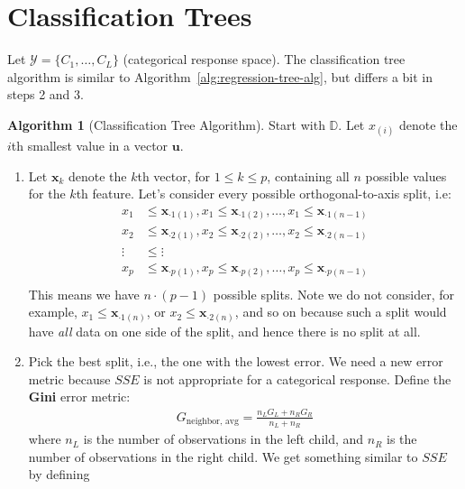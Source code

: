 \documentclass[12pt, a4paper]{article}
\theoremstyle{definition}
\newtheorem{algorithm}{Algorithm}
\begin{document}
	\section*{Classification Trees}
	Let $\mathcal{Y} = \{C_1, \ldots, C_L\}$ (categorical response space).
	The classification tree algorithm is similar to Algorithm~\ref{alg:regression-tree-alg},
	but differs a bit in steps 2 and 3.
	
	\begin{tcolorbox}[breakable]
		\begin{algorithm}[Classification Tree Algorithm]\label{alg:classification-tree-alg}
			Start with $\mathbb{D}$. Let $x_{(i)}$ denote the $i$th smallest
			value in a vector $\bm{u}$.
			\begin{enumerate}[label=(\arabic*)]
				\item Let $\bm{x}_k$ denote the $k$th vector, for $1\leq k\leq p$,
				containing all $n$ possible values for the $k$th feature.
				Let's consider every possible orthogonal-to-axis split, i.e:
				\begin{align*}
					x_1&\leq \bm{x}_{\cdot 1(1)}, x_1 \leq \bm{x}_{\cdot 1(2)}, \ldots, x_1 \leq \bm{x}_{\cdot 1(n-1)}\\
					x_2&\leq \bm{x}_{\cdot 2(1)}, x_2 \leq \bm{x}_{\cdot 2(2)}, \ldots, x_2 \leq \bm{x}_{\cdot 2(n-1)}\\
					\vdots & \leq  \vdots\\
					x_p&\leq \bm{x}_{\cdot p(1)}, x_p \leq \bm{x}_{\cdot p(2)}, \ldots, x_p \leq \bm{x}_{\cdot p(n-1)}\\
				\end{align*}
				This means we have $n\cdot (p-1)$ possible splits. Note we do not
				consider, for example, $x_1\leq \bm{x}_{\cdot 1(n)}$,
				or $x_2\leq \bm{x}_{\cdot 2(n)}$, and so on because such a split
				would have \textit{all} data on one side of the split, and hence
				there is no split at all.
				\item Pick the best split, i.e., the one with the lowest error.
				We need a new error metric because $SSE$ is not appropriate for
				a categorical response. Define the \textbf{Gini} error metric:
				\begin{align*}
					G_{\text{neighbor, avg}} = \frac{n_L G_L + n_R G_R}{n_L + n_R}
				\end{align*}
				where $n_L$ is the number of observations in the left child,
				and $n_R$ is the number of observations in the right child.
				We get something similar to $SSE$ by defining
				\begin{align*}

\end{align*}
\end{enumerate}
\end{algorithm}
\end{tcolorbox}
\end{document}

